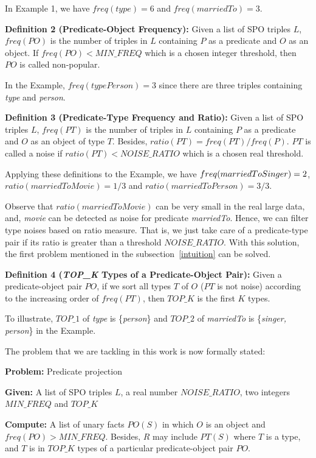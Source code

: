 \documentclass{acm_proc_article-sp}
\begin{document}
In Example 1, we have $freq(type) = 6$ and $freq(marriedTo) = 3$.

\textbf{Definition 2 (Predicate-Object Frequency):} Given a list of SPO triples $L$, $freq(PO)$ is the number of triples in $L$ containing $P$ as a predicate and $O$ as an object. If $freq(PO) < MIN\_FREQ$ which is a chosen integer threshold, then $PO$ is called non-popular.

In the Example, $freq(typePerson) = 3$ since there are three triples containing \textit{type} and \textit{person}.

\textbf{Definition 3 (Predicate-Type Frequency and Ratio):} Given a list of SPO triples $L$, $freq(PT)$ is the number of triples in $L$ containing $P$ as a predicate and $O$ as an object of type $T$. Besides, $ratio(PT) = freq(PT) / freq(P)$. $PT$ is called a noise if $ratio(PT) < NOISE\_RATIO$ which is a chosen real threshold.

Applying these definitions to the Example, we have $freq\\(marriedToSinger) = 2$, $ratio(marriedToMovie) = 1 / 3$ and $ratio(marriedToPerson) = 3 / 3$.

Observe that $ratio(marriedToMovie)$ can be very small in the real large data, and, \textit{movie} can be detected as noise for predicate \textit{marriedTo}. Hence, we can filter type noises based on ratio measure. That is, we just take care of a predicate-type pair if its ratio is greater than a threshold $NOISE\_RATIO$. With this solution, the first problem mentioned in the subsection~\ref{intuition} can be solved.

\textbf{Definition 4 (\textit{TOP\_K} Types of a Predicate-Object Pair):} Given a predicate-object pair $PO$, if we sort all types $T$ of $O$ ($PT$ is not noise) according to the increasing order of $freq(PT)$, then $TOP\_K$ is the first $K$ types.

To illustrate, $TOP\_1$ of \textit{type} is \{\textit{person}\} and $TOP\_2$ of \textit{marriedTo} is \{\textit{singer, person}\} in the Example.

The problem that we are tackling in this work is now formally stated:

\begin{framed}
\textbf{Problem:} Predicate projection

\textbf{Given:} A list of SPO triples $L$, a real number $NOISE\_RATIO$, two integers $MIN\_FREQ$ and $TOP\_K$

\textbf{Compute:} A list of unary facts $PO(S)$ in which $O$ is an object and $freq(PO) > MIN\_FREQ$. Besides, $R$ may include $PT(S)$ where $T$ is a type, and $T$ is in $TOP\_K$ types of a particular predicate-object pair $PO$.
\end{framed}
\end{document}
